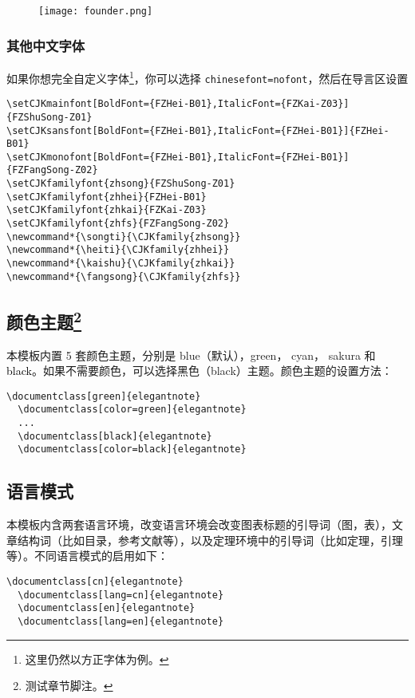 \documentclass[cn,hazy,blue,14pt,screen]{elegantnote}
\begin{document}
\begin{figure}[!htb]
\centering
\texttt{[image: founder.png]}
\end{figure}

\subsubsection{其他中文字体}
如果你想完全自定义字体\footnote{这里仍然以方正字体为例。}，你可以选择 \lstinline{chinesefont=nofont}，然后在导言区设置
\begin{lstlisting}
\setCJKmainfont[BoldFont={FZHei-B01},ItalicFont={FZKai-Z03}]{FZShuSong-Z01}
\setCJKsansfont[BoldFont={FZHei-B01},ItalicFont={FZHei-B01}]{FZHei-B01}
\setCJKmonofont[BoldFont={FZHei-B01},ItalicFont={FZHei-B01}]{FZFangSong-Z02}
\setCJKfamilyfont{zhsong}{FZShuSong-Z01}
\setCJKfamilyfont{zhhei}{FZHei-B01}
\setCJKfamilyfont{zhkai}{FZKai-Z03}
\setCJKfamilyfont{zhfs}{FZFangSong-Z02}
\newcommand*{\songti}{\CJKfamily{zhsong}}
\newcommand*{\heiti}{\CJKfamily{zhhei}}
\newcommand*{\kaishu}{\CJKfamily{zhkai}}
\newcommand*{\fangsong}{\CJKfamily{zhfs}}
\end{lstlisting}


\subsection[颜色主题]{颜色主题\footnote{测试章节脚注。}}

本模板内置 5 套颜色主题，分别是 \textcolor{eblue}{blue}（默认），\textcolor{egreen}{green}， \textcolor{ecyan}{cyan}， \textcolor{sakura}{sakura} 和 \textcolor{black}{black}。如果不需要颜色，可以选择黑色（black）主题。颜色主题的设置方法：
\begin{lstlisting}[frame=none]  
  \documentclass[green]{elegantnote}
  \documentclass[color=green]{elegantnote}
  ...
  \documentclass[black]{elegantnote}
  \documentclass[color=black]{elegantnote}
\end{lstlisting}


\subsection{语言模式}

本模板内含两套语言环境，改变语言环境会改变图表标题的引导词（图，表），文章结构词（比如目录，参考文献等），以及定理环境中的引导词（比如定理，引理等）。不同语言模式的启用如下：
\begin{lstlisting}[frame=none]  
  \documentclass[cn]{elegantnote} 
  \documentclass[lang=cn]{elegantnote} 
  \documentclass[en]{elegantnote} 
  \documentclass[lang=en]{elegantnote}
\end{lstlisting}
\end{document}

